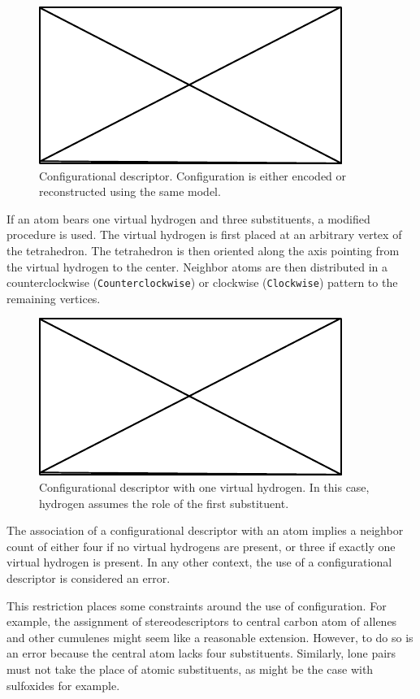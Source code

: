 \documentclass{article}
\def\ttt{\texttt}
\begin{document}
\begin{figure}
    \centering
    \includegraphics{filler}
    \caption{Configurational descriptor. Configuration is either encoded or reconstructed using the same model.}
    \label{fig:configurational-descriptor}
\end{figure}

If an atom bears one virtual hydrogen and three substituents, a modified procedure is used. The virtual hydrogen is first placed at an arbitrary vertex of the tetrahedron. The tetrahedron is then oriented along the axis pointing from the virtual hydrogen to the center. Neighbor atoms are then distributed in a counterclockwise (\ttt{Counterclockwise}) or clockwise (\ttt{Clockwise}) pattern to the remaining vertices.

\begin{figure}
    \centering
    \includegraphics{filler}
    \caption{Configurational descriptor with one virtual hydrogen. In this case, hydrogen assumes the role of the first substituent.}
    \label{fig:configurational-descriptor-vh}
\end{figure}

The association of a configurational descriptor with an atom implies a neighbor count of either four if no virtual hydrogens are present, or three if exactly one virtual hydrogen is present. In any other context, the use of a configurational descriptor is considered an error.

This restriction places some constraints around the use of configuration. For example, the assignment of stereodescriptors to central carbon atom of allenes and other cumulenes might seem like a reasonable extension. However, to do so is an error because the central atom lacks four substituents. Similarly, lone pairs must not take the place of atomic substituents, as might be the case with sulfoxides for example.
\end{document}
